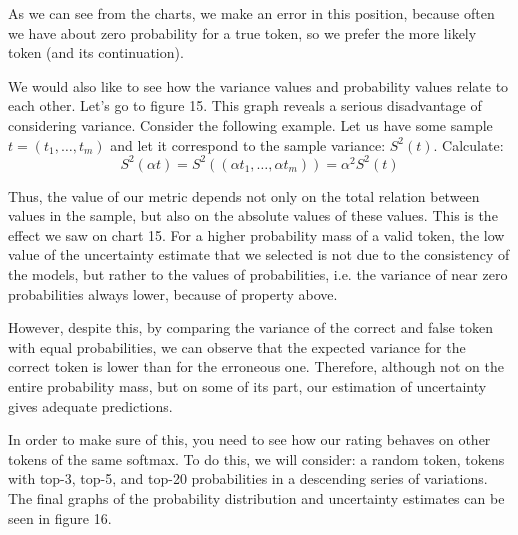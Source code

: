\documentclass[a4paper,14pt]{extarticle}
\begin{document}
	As we can see from the charts, we make an error in this position, because often we have about zero probability for a true token, so we prefer the more likely token (and its continuation).
	
	\begin{figure}[t]
	\end{figure}
	We would also like to see how the variance values and probability values relate to each other. Let's go to figure 15. This graph reveals a serious disadvantage of considering variance. Consider the following example. Let us have some sample $t = (t_1, \dots, t_m)$ and let it correspond to the sample variance: $S^2 (t)$. Calculate:
	\begin{equation*}
		S^2(\alpha t) = S^2((\alpha t_1, \dots, \alpha t_m)) = \alpha^2 S^2(t)
	\end{equation*}
	
	Thus, the value of our metric depends not only on the total relation between values in the sample, but also on the absolute values of these values. This is the effect we saw on chart 15. For a higher probability mass of a valid token, the low value of the uncertainty estimate that we selected is not due to the consistency of the models, but rather to the values of probabilities, i.e. the variance of near zero probabilities always lower, because of property above.

	However, despite this, by comparing the variance of the correct and false token with equal probabilities, we can observe that the expected variance for the correct token is lower than for the erroneous one. Therefore, although not on the entire probability mass, but on some of its part, our estimation of uncertainty gives adequate predictions.

	In order to make sure of this, you need to see how our rating behaves on other tokens of the same softmax. To do this, we will consider: a random token, tokens with top-3, top-5, and top-20 probabilities in a descending series of variations. The final graphs of the probability distribution and uncertainty estimates can be seen in figure 16.
	
\end{document}
